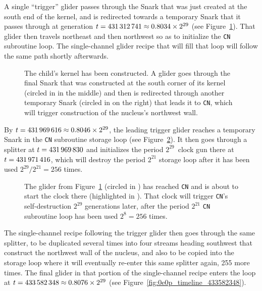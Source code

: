 A single ``trigger'' glider passes through the Snark that was just created at the south end of the kernel, and is redirected towards a temporary Snark that it passes through at generation $t = 431{\,}312{\,}741 \approx 0.8034 \times 2^{29}$ (see Figure~\ref{fig:0e0p_timeline_431312741}). That glider then travels northeast and then northwest so as to initialize the \texttt{CN} subroutine loop. The single-channel glider recipe that will fill that loop will follow the same path shortly afterwards.

\begin{figure}[!htb]
	\centering
	\caption{The child's kernel has been constructed. A glider goes through the final Snark that was constructed at the south corner of its kernel (circled in  in the middle) and then is redirected through another temporary Snark (circled in  on the right) that leads it to \texttt{CN}, which will trigger construction of the nucleus's northwest wall.}
	\label{fig:0e0p_timeline_431312741}
\end{figure}

By $t = 431{\,}969{\,}616 \approx 0.8046 \times 2^{29}$, the leading trigger glider reaches a temporary Snark in the \texttt{CN} subroutine storage loop (see Figure~\ref{fig:0e0p_timeline_431969616}). It then goes through a splitter at $t = 431{\,}969{\,}830$ and initializes the period $2^{29}$~clock gun there at $t = 431{\,}971{\,}416$, which will destroy the period $2^{21}$ storage loop after it has been used $2^{29}/2^{21} = 256$ times.

\begin{figure}[!htb]
	\centering
	\caption{The glider from Figure~\ref{fig:0e0p_timeline_431312741} (circled in ) has reached \texttt{CN} and is about to start the clock there (highlighted in ). That clock will trigger \texttt{CN}'s self-destruction $2^{29}$ generations later, after the period $2^{21}$ \texttt{CN} subroutine loop has been used $2^8 = 256$ times.}
	\label{fig:0e0p_timeline_431969616}
\end{figure}

The single-channel recipe following the trigger glider then goes through the same splitter, to be duplicated several times into four streams heading southwest that construct the northwest wall of the nucleus, and also to be copied into the storage loop where it will eventually re-enter this same splitter again, 255 more times. The final glider in that portion of the single-channel recipe enters the loop at $t = 433{\,}582{\,}348 \approx 0.8076 \times 2^{29}$ (see Figure~\ref{fig:0e0p_timeline_433582348}).

